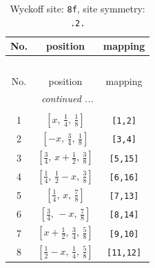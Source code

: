 \documentclass[fleqn,8pt]{jsarticle}
\begin{document}
\begin{longtable}{ccc}
\caption{Wyckoff site: {\tt 8f}, site symmetry: {\tt .2.}}
 \\
 \hline \hline
No. & position & mapping \\ \hline \endfirsthead

\multicolumn{2}{l}{\tablename\ \thetable{}} \\
 \hline \hline
No. & position & mapping \\ \hline \endhead

 \hline \hline
\multicolumn{2}{r}{\footnotesize\it continued ...} \\ \endfoot

 \hline \hline
\multicolumn{2}{r}{} \\ \endlastfoot

1 & $\left[ x,\, \frac{1}{4},\, \frac{1}{8} \right]$ & {\tt [1,2]} \\ \hline
2 & $\left[ - x,\, \frac{3}{4},\, \frac{1}{8} \right]$ & {\tt [3,4]} \\ \hline
3 & $\left[ \frac{3}{4},\, x + \frac{1}{2},\, \frac{3}{8} \right]$ & {\tt [5,15]} \\ \hline
4 & $\left[ \frac{1}{4},\, \frac{1}{2} - x,\, \frac{3}{8} \right]$ & {\tt [6,16]} \\ \hline
5 & $\left[ \frac{1}{4},\, x,\, \frac{7}{8} \right]$ & {\tt [7,13]} \\ \hline
6 & $\left[ \frac{3}{4},\, - x,\, \frac{7}{8} \right]$ & {\tt [8,14]} \\ \hline
7 & $\left[ x + \frac{1}{2},\, \frac{3}{4},\, \frac{5}{8} \right]$ & {\tt [9,10]} \\ \hline
8 & $\left[ \frac{1}{2} - x,\, \frac{1}{4},\, \frac{5}{8} \right]$ & {\tt [11,12]} \\
\end{longtable}
\renewcommand{\arraystretch}{1.2}
\end{document}
